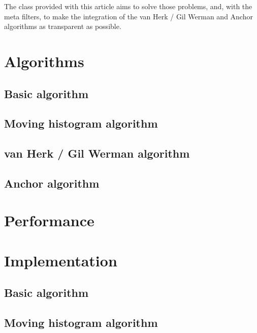 \documentclass{InsightArticle}
\begin{document}
The  class provided with this article aims to solve those
problems, and, with the meta filters, to make the integration of the van Herk
/ Gil Werman and Anchor algorithms as transparent as possible.

\section{Algorithms}

 \subsection{Basic algorithm}

 \subsection{Moving histogram algorithm}

 \subsection{van Herk / Gil Werman algorithm}

 \subsection{Anchor algorithm}

\section{Performance}

% 

\section{Implementation}

 \subsection{Basic algorithm}

 \subsection{Moving histogram algorithm}
\end{document}
